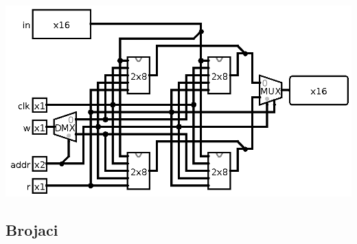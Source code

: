 \documentclass[12p,a4paper]{article}
\begin{document}
\begin{multicols}{2}
    \includegraphics[width=\columnwidth]{Figures/mem416.png}

    \subsection{Brojaci}
    

\end{multicols}
\end{document}
